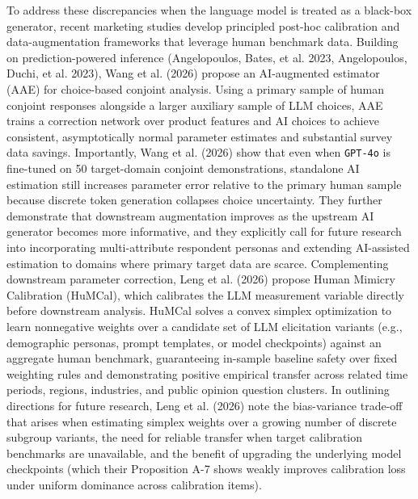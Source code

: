 \documentclass[
  letterpaper,
  DIV=11,
  numbers=noendperiod]{scrartcl}
\begin{document}
To address these discrepancies when the language model is treated as a
black-box generator, recent marketing studies develop principled
post-hoc calibration and data-augmentation frameworks that leverage
human benchmark data. Building on prediction-powered inference
(Angelopoulos, Bates, et al. 2023, Angelopoulos, Duchi, et al. 2023),
Wang et al. (2026) propose an AI-augmented estimator (AAE) for
choice-based conjoint analysis. Using a primary sample of human conjoint
responses alongside a larger auxiliary sample of LLM choices, AAE trains
a correction network over product features and AI choices to achieve
consistent, asymptotically normal parameter estimates and substantial
survey data savings. Importantly, Wang et al. (2026) show that even when
\texttt{GPT-4o} is fine-tuned on 50 target-domain conjoint
demonstrations, standalone AI estimation still increases parameter error
relative to the primary human sample because discrete token generation
collapses choice uncertainty. They further demonstrate that downstream
augmentation improves as the upstream AI generator becomes more
informative, and they explicitly call for future research into
incorporating multi-attribute respondent personas and extending
AI-assisted estimation to domains where primary target data are scarce.
Complementing downstream parameter correction, Leng et al. (2026)
propose Human Mimicry Calibration (HuMCal), which calibrates the LLM
measurement variable directly before downstream analysis. HuMCal solves
a convex simplex optimization to learn nonnegative weights over a
candidate set of LLM elicitation variants (e.g., demographic personas,
prompt templates, or model checkpoints) against an aggregate human
benchmark, guaranteeing in-sample baseline safety over fixed weighting
rules and demonstrating positive empirical transfer across related time
periods, regions, industries, and public opinion question clusters. In
outlining directions for future research, Leng et al. (2026) note the
bias-variance trade-off that arises when estimating simplex weights over
a growing number of discrete subgroup variants, the need for reliable
transfer when target calibration benchmarks are unavailable, and the
benefit of upgrading the underlying model checkpoints (which their
Proposition A-7 shows weakly improves calibration loss under uniform
dominance across calibration items).
\end{document}

